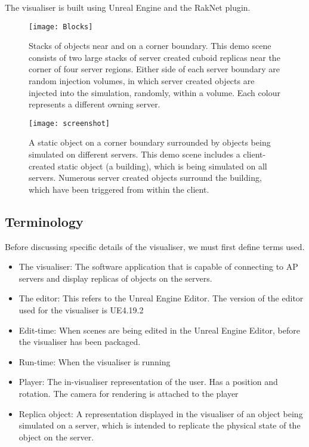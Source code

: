 The visualiser is built using Unreal Engine and the RakNet plugin.


\begin{figure}[!t]
	\centering
	\texttt{[image: Blocks]}
	\caption{Stacks of objects near and on a corner boundary. This demo scene consists of two large stacks of server created cuboid replicas near the corner of four server regions. Either side of each server boundary are random injection volumes, in which server created objects are injected into the simulation, randomly, within a volume. Each colour represents a different owning server.}
	\label{fig_screen1}
\end{figure}

\begin{figure}[!t]
	\centering
	\texttt{[image: screenshot]}
	\caption{A static object on a corner boundary surrounded by objects being simulated on different servers. This demo scene includes a client-created static object (a building), which is being simulated on all servers. Numerous server created objects surround the building, which have been triggered from within the client.}
	\label{fig_screen2}
\end{figure}

\subsection{Terminology}
Before discussing specific details of the visualiser, we must first define terms used.
\begin{itemize}
	\item The visualiser: The software application that is capable of connecting to AP servers and display replicas of objects on the servers.
	\item The editor: This refers to the Unreal Engine Editor. The version of the editor used for the visualiser is UE4.19.2
	\item Edit-time: When scenes are being edited in the Unreal Engine Editor, before the visualiser has been packaged.
	\item Run-time: When the visualiser is running
	\item Player: The in-visualiser representation of the user. Has a position and rotation. The camera for rendering is attached to the player
	\item Replica object: A representation displayed in the visualiser of an object being simulated on a server, which is intended to replicate the physical state of the object on the server.
\end{itemize}

